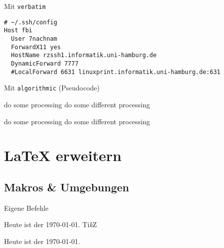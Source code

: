\documentclass{beamer}
\begin{document}

		\begin{frame}[containsverbatim]{Mit \texttt{verbatim}}
{
\small
			\begin{verbatim}
# ~/.ssh/config
Host fbi
  User 7nachnam
  ForwardX11 yes
  HostName rzssh1.informatik.uni-hamburg.de
  DynamicForward 7777
  #LocalForward 6631 linuxprint.informatik.uni-hamburg.de:631			
			\end{verbatim}
}

		\end{frame}		

		
		\begin{frame}[containsverbatim]{Mit \texttt{algorithmic} (Pseudocode)}
			\begin{smalllatexcode}
\begin{algorithmic}
        \STATE do some processing
        \STATE do some different processing
    \ENDIF
\end{algorithmic}
			\end{smalllatexcode}

\begin{algorithmic}
        \STATE do some processing
        \STATE do some different processing
    \ENDIF
\end{algorithmic}

		\end{frame}


		\section{\LaTeX{} erweitern}
		\subsection{Makros \& Umgebungen}
		\begin{frame}[containsverbatim]{Eigene Befehle}
			\begin{latexcode}
\def\heute{Heute ist der \today.}
\newcommand{\heute}{Heute ist der \today.}
\newcommand{\TikZ}{Ti\textit{k}Z}
\heute
\TikZ
			\end{latexcode}
			Heute ist der \today.\\
			\TikZ
		\end{frame}
\end{document}
